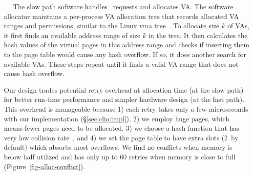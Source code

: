 ~~
The slow path software handles \alloc\ requests and allocates VA.
The software allocator maintains a per-process VA allocation tree that records allocated VA ranges and permissions, similar to the Linux vma tree~\cite{linux-rb-vma}.
To allocate size $k$ of VAs, it first finds an available address range of size $k$ in the tree.
It then calculates the hash values of the virtual pages in this address range
and checks if inserting them to the page table would cause any hash overflow. 
If so, it %
does another search for available VAs.
These steps repeat until it finds a valid VA range that does not cause hash overflow.

Our design trades potential retry overhead at allocation time (at the slow path) for better run-time performance and simpler hardware design (at the fast path).
This overhead is manageable because
1) each retry takes only a few microseconds with our implementation (\S\ref{sec:clio:impl}),
2) we employ huge pages, which means fewer pages need to be allocated, 
3) we choose a hash function that has very low collision rate~\cite{lookup3-wiki},
and 4) we set the page table to have extra slots (2\x\ by default) which absorbs most overflows.
We find no conflicts when memory is below half utilized and has only up to 60 retries when memory is close to full (Figure~\ref{fig-alloc-conflict}).


